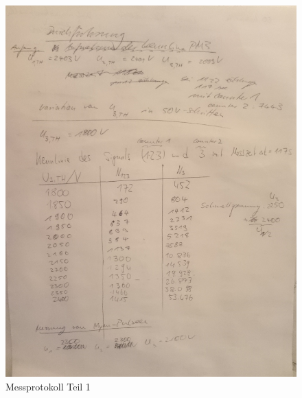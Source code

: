 	\begin{figure}[ht]
						\centering
						\includegraphics[width = 1.\linewidth]{pic/mess1.png}
						\caption{Messprotokoll Teil 1}
	\end{figure}
